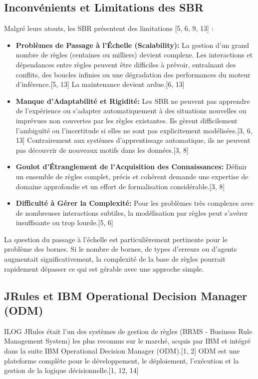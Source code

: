 \documentclass[11pt,a4paper]{article}
\begin{document}
\subsection{Inconvénients et Limitations des SBR}

Malgré leurs atouts, les SBR présentent des limitations [5, 6, 9, 13] :
\begin{itemize}
    \item \textbf{Problèmes de Passage à l'Échelle (Scalability):} La gestion d'un grand nombre de règles (centaines ou milliers) devient complexe. Les interactions et dépendances entre règles peuvent être difficiles à prévoir, entraînant des conflits, des boucles infinies ou une dégradation des performances du moteur d'inférence.[5, 13] La maintenance devient ardue.[6, 13]
    \item \textbf{Manque d'Adaptabilité et Rigidité:} Les SBR ne peuvent pas apprendre de l'expérience ou s'adapter automatiquement à des situations nouvelles ou imprévues non couvertes par les règles existantes. Ils gèrent difficilement l'ambiguïté ou l'incertitude si elles ne sont pas explicitement modélisées.[3, 6, 13] Contrairement aux systèmes d'apprentissage automatique, ils ne peuvent pas découvrir de nouveaux motifs dans les données.[3, 8]
    \item \textbf{Goulot d'Étranglement de l'Acquisition des Connaissances:} Définir un ensemble de règles complet, précis et cohérent demande une expertise de domaine approfondie et un effort de formalisation considérable.[3, 8]
    \item \textbf{Difficulté à Gérer la Complexité:} Pour les problèmes très complexes avec de nombreuses interactions subtiles, la modélisation par règles peut s'avérer insuffisante ou trop lourde.[5, 6]
\end{itemize}
La question du passage à l'échelle est particulièrement pertinente pour le problème des bornes. Si le nombre de bornes, de types d'erreurs ou d'agents augmentait significativement, la complexité de la base de règles pourrait rapidement dépasser ce qui est gérable avec une approche simple.

\subsection{JRules et IBM Operational Decision Manager (ODM)}

ILOG JRules était l'un des systèmes de gestion de règles (BRMS - Business Rule Management System) les plus reconnus sur le marché, acquis par IBM et intégré dans la suite IBM Operational Decision Manager (ODM).[1, 2] ODM est une plateforme complète pour le développement, le déploiement, l'exécution et la gestion de la logique décisionnelle.[1, 12, 14]
\end{document}
